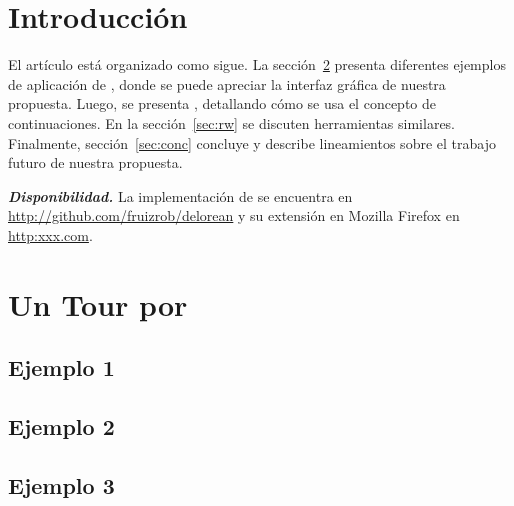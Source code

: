 \documentclass[conference]{IEEEtran}
\begin{document}
\section{Introducci\'on}
\label{sec:intro}


\bigskip

El art\'iculo est\'a organizado como sigue. La secci\'on~\ref{sec:tour} presenta diferentes ejemplos de aplicaci\'on de \deloreanjs, donde se puede apreciar la interfaz gr\'afica de nuestra propuesta. Luego, se presenta \deloreanjs, detallando c\'omo se usa el concepto de continuaciones. En la secci\'on~\ref{sec:rw} se discuten herramientas similares. Finalmente, secci\'on~\ref{sec:conc} concluye y describe lineamientos sobre el trabajo futuro de nuestra propuesta.      

\smallskip

{\bf {\em Disponibilidad.}} La implementaci\'on de \deloreanjs se encuentra en \url{http://github.com/fruizrob/delorean} y su extensi\'on en Mozilla Firefox en \url{http:xxx.com}. 



\section{Un Tour por \deloreanjs}
\label{sec:tour}


\subsection{Ejemplo 1}
\label{sec:tour1}


\subsection{Ejemplo 2}
\label{sec:tour2}


\subsection{Ejemplo 3}
\label{sec:tour3}


\bigskip

\section{\deloreanjs}
\label{sec:deloreanjs}
\end{document}
